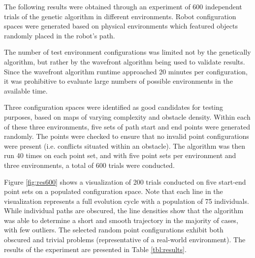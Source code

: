 %
The following results were obtained through an experiment of 600 independent trials of the genetic algorithm in different environments. Robot configuration spaces were generated based on physical environments which featured objects randomly placed in the robot's path.

The number of test environment configurations was limited not by the genetically algorithm, but rather by the wavefront algorithm being used to validate results. Since the wavefront algorithm runtime approached 20 minutes per configuration, it was prohibitive to evaluate large numbers of possible environments in the available time.

Three configuration spaces were identified as good candidates for testing purposes, based on maps of varying complexity and obstacle density. Within each of these three environments, five sets of path start and end points were generated randomly. The points were checked to ensure that no invalid point configurations were present (i.e. conflicts situated within an obstacle). The algorithm was then run 40 times on each point set, and with five point sets per environment and three environments, a total of 600 trials were conducted.

Figure \ref{fig:res600} shows a visualization of 200 trials conducted on five start-end point sets on a populated configuration space. Note that each line in the visualization represents a full evolution cycle with a population of 75 individuals. While individual paths are obscured, the line densities show that the algorithm was able to determine a short and smooth trajectory in the majority of cases, with few outliers. The selected random point configurations exhibit both obscured and trivial problems (representative of a real-world environment). The results of the experiment are presented in Table \ref{tbl:results}.

